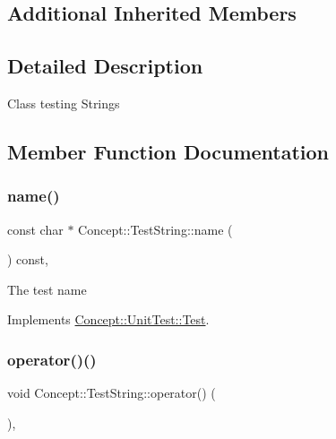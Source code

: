\subsection*{Additional Inherited Members}


\subsection{Detailed Description}
Class testing Strings 

\subsection{Member Function Documentation}
\mbox{\label{class_concept_1_1_test_string_a0d43f2724c9d8c3eec87076cdd418461}} 
\subsubsection{\texorpdfstring{name()}{name()}}
{\footnotesize\ttfamily const char $\ast$ Concept\+::\+Test\+String\+::name (\begin{DoxyParamCaption}{ }\end{DoxyParamCaption}) const\hspace{0.3cm}{\ttfamily [override]}, {\ttfamily [virtual]}}

The test name 

Implements \mbox{\hyperlink{class_concept_1_1_unit_test_1_1_test_a28c0cddd9719cd456fa92a142ae6c59d}{Concept\+::\+Unit\+Test\+::\+Test}}.

\mbox{\label{class_concept_1_1_test_string_a4d493ef2d0632c5015042821be5682ff}} 
\subsubsection{\texorpdfstring{operator()()}{operator()()}}
{\footnotesize\ttfamily void Concept\+::\+Test\+String\+::operator() (\begin{DoxyParamCaption}{ }\end{DoxyParamCaption})\hspace{0.3cm}{\ttfamily [override]}, {\ttfamily [virtual]}}


